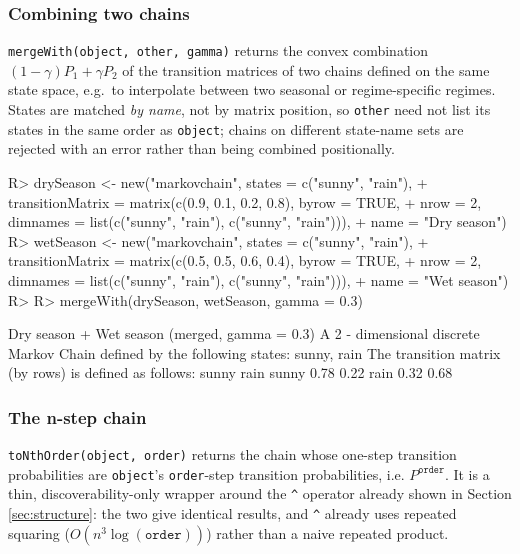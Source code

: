 \documentclass[
  nojss]{jss}
\begin{document}
\subsubsection{Combining two chains}\label{combining-two-chains}

\texttt{mergeWith(object,\ other,\ gamma)} returns the convex combination
\((1-\gamma)P_1+\gamma P_2\) of the transition matrices of two chains defined
on the same state space, e.g.~to interpolate between two seasonal or
regime-specific regimes. States are matched \emph{by name}, not by matrix
position, so \texttt{other} need not list its states in the same order as
\texttt{object}; chains on different state-name sets are rejected with an error
rather than being combined positionally.

\begin{CodeChunk}
\begin{CodeInput}
R> drySeason <- new("markovchain", states = c("sunny", "rain"),
+                  transitionMatrix = matrix(c(0.9, 0.1, 0.2, 0.8), byrow = TRUE,
+                    nrow = 2, dimnames = list(c("sunny", "rain"), c("sunny", "rain"))),
+                  name = "Dry season")
R> wetSeason <- new("markovchain", states = c("sunny", "rain"),
+                  transitionMatrix = matrix(c(0.5, 0.5, 0.6, 0.4), byrow = TRUE,
+                    nrow = 2, dimnames = list(c("sunny", "rain"), c("sunny", "rain"))),
+                  name = "Wet season")
R> 
R> mergeWith(drySeason, wetSeason, gamma = 0.3)
\end{CodeInput}
\begin{CodeOutput}
Dry season + Wet season (merged, gamma = 0.3) 
 A  2 - dimensional discrete Markov Chain defined by the following states: 
 sunny, rain 
 The transition matrix  (by rows)  is defined as follows: 
      sunny rain
sunny  0.78 0.22
rain   0.32 0.68
\end{CodeOutput}
\end{CodeChunk}

\subsubsection{The n-step chain}\label{the-n-step-chain}

\texttt{toNthOrder(object,\ order)} returns the chain whose one-step transition
probabilities are \texttt{object}'s \texttt{order}-step transition probabilities, i.e.
\(P^{\mathtt{order}}\). It is a thin, discoverability-only wrapper around the
\texttt{\^{}} operator already shown in Section \ref{sec:structure}: the two give
identical results, and \texttt{\^{}} already uses repeated squaring
(\(O(n^3\log(\mathtt{order}))\)) rather than a naive repeated product.
\end{document}
